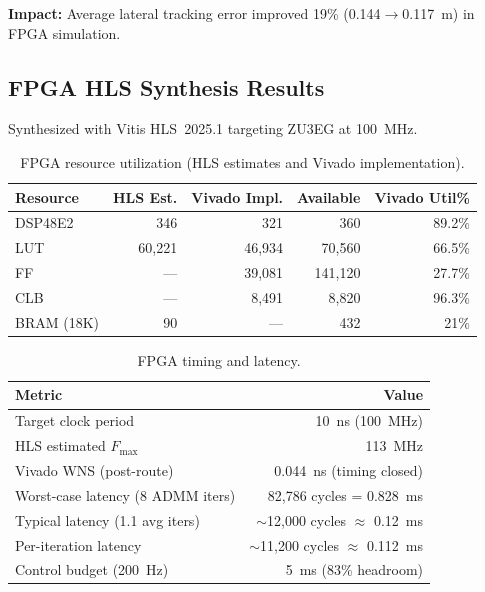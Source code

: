 \documentclass[11pt,a4paper]{article}
\begin{document}
\textbf{Impact:} Average lateral tracking error improved 19\% (0.144$\to$\SI{0.117}{\metre}) in FPGA simulation.

\subsection{FPGA HLS Synthesis Results}
Synthesized with Vitis HLS~2025.1 targeting ZU3EG at \SI{100}{\mega\hertz}.

\begin{table}[H]
\centering
\caption{FPGA resource utilization (HLS estimates and Vivado implementation).}
\label{tab:fpga_synthesis}
\begin{tabular}{@{}lrrrr@{}}
\toprule
\textbf{Resource} & \textbf{HLS Est.} & \textbf{Vivado Impl.} & \textbf{Available} & \textbf{Vivado Util\%} \\
\midrule
DSP48E2   & 346  & 321    & 360     & 89.2\% \\
LUT       & 60,221 & 46,934 & 70,560 & 66.5\% \\
FF        & ---  & 39,081 & 141,120 & 27.7\% \\
CLB       & ---  & 8,491  & 8,820   & 96.3\% \\
BRAM (18K)& 90   & ---    & 432     & 21\% \\
\bottomrule
\end{tabular}
\end{table}

\begin{table}[H]
\centering
\caption{FPGA timing and latency.}
\label{tab:fpga_timing}
\begin{tabular}{@{}lr@{}}
\toprule
\textbf{Metric} & \textbf{Value} \\
\midrule
Target clock period         & \SI{10}{\nano\second} (\SI{100}{\mega\hertz}) \\
HLS estimated $F_\text{max}$    & \SI{113}{\mega\hertz} \\
Vivado WNS (post-route)    & \SI{+0.044}{\nano\second} (timing closed) \\
Worst-case latency (8 ADMM iters) & 82,786 cycles = \SI{0.828}{\milli\second} \\
Typical latency (1.1 avg iters)   & $\sim$12,000 cycles $\approx$ \SI{0.12}{\milli\second} \\
Per-iteration latency       & $\sim$11,200 cycles $\approx$ \SI{0.112}{\milli\second} \\
Control budget (\SI{200}{\hertz}) & \SI{5}{\milli\second} (83\% headroom) \\
\bottomrule
\end{tabular}
\end{table}
\end{document}
